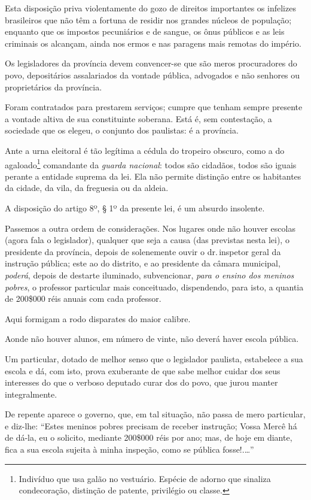 Esta disposição priva violentamente do gozo de direitos importantes os
infelizes brasileiros que não têm a fortuna de residir nos grandes
núcleos de população; enquanto que os impostos pecuniários e de sangue,
os ônus públicos e as leis criminais os alcançam, ainda nos ermos e nas
paragens mais remotas do império.

Os legisladores da província devem convencer-se que são meros
procuradores do povo, depositários assalariados da vontade pública,
advogados e não senhores ou proprietários da província.

Foram contratados para prestarem serviços; cumpre que tenham sempre
presente a vontade altiva de sua constituinte soberana. Está é, sem
contestação, a sociedade que os elegeu, o conjunto dos paulistas: é a
província.

Ante a urna eleitoral é tão legítima a cédula do tropeiro obscuro, como
a do agaloado\footnote{Indivíduo que usa galão no vestuário. Espécie
  de adorno que sinaliza condecoração, distinção de patente, privilégio
  ou classe.} comandante da \emph{guarda nacional}: todos são cidadãos,
todos são iguais perante a entidade suprema da lei. Ela não permite
distinção entre os habitantes da cidade, da vila, da freguesia ou da
aldeia.

A disposição do artigo 8º, § 1º da presente lei, é um absurdo insolente.

Passemos a outra ordem de considerações. Nos lugares onde não houver
escolas (agora fala o legislador), qualquer que seja a causa (das
previstas nesta lei), o presidente da província, depois de solenemente
ouvir o dr.\,inspetor geral da instrução pública; este ao do distrito, e
ao presidente da câmara municipal, \emph{poderá}, depois de destarte
iluminado, subvencionar, \emph{para o ensino dos meninos pobres}, o
professor particular mais conceituado, dispendendo, para isto, a quantia
de 200\$000 réis anuais com cada professor.

Aqui formigam a rodo disparates do maior calibre.

Aonde não houver alunos, em número de vinte, não deverá haver escola
pública.

Um particular, dotado de melhor senso que o legislador paulista,
estabelece a sua escola e dá, com isto, prova exuberante de que sabe
melhor cuidar dos seus interesses do que o verboso deputado curar dos do
povo, que jurou manter integralmente.

De repente aparece o governo, que, em tal situação, não passa de mero
particular, e diz-lhe: ``Estes meninos pobres precisam de receber
instrução; Vossa Mercê há de dá-la, eu o solicito, mediante 200\$000
réis por ano; mas, de hoje em diante, fica a sua escola sujeita à minha
inspeção, como se pública fosse!.\ldots''

